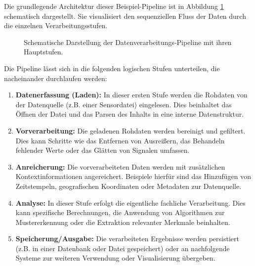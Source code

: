 \documentclass[11pt, a4paper]{article}
\begin{document}
Die grundlegende Architektur dieser Beispiel-Pipeline ist in Abbildung \ref{fig:architektur} schematisch dargestellt. Sie visualisiert den sequenziellen Fluss der Daten durch die einzelnen Verarbeitungsstufen.

\begin{figure}[htbp] %
    \centering %
    \caption{Schematische Darstellung der Datenverarbeitungs-Pipeline mit ihren Hauptstufen.} %
    \label{fig:architektur} %
\end{figure}

Die Pipeline lässt sich in die folgenden logischen Stufen unterteilen, die nacheinander durchlaufen werden:

\begin{enumerate}
    \item \textbf{Datenerfassung (Laden):} In dieser ersten Stufe werden die Rohdaten von der Datenquelle (z.B. einer Sensordatei) eingelesen. Dies beinhaltet das Öffnen der Datei und das Parsen des Inhalts in eine interne Datenstruktur.
    \item \textbf{Vorverarbeitung:} Die geladenen Rohdaten werden bereinigt und gefiltert. Dies kann Schritte wie das Entfernen von Ausreißern, das Behandeln fehlender Werte oder das Glätten von Signalen umfassen.
    \item \textbf{Anreicherung:} Die vorverarbeiteten Daten werden mit zusätzlichen Kontextinformationen angereichert. Beispiele hierfür sind das Hinzufügen von Zeitstempeln, geografischen Koordinaten oder Metadaten zur Datenquelle.
    \item \textbf{Analyse:} In dieser Stufe erfolgt die eigentliche fachliche Verarbeitung. Dies kann spezifische Berechnungen, die Anwendung von Algorithmen zur Mustererkennung oder die Extraktion relevanter Merkmale beinhalten.
    \item \textbf{Speicherung/Ausgabe:} Die verarbeiteten Ergebnisse werden persistiert (z.B. in einer Datenbank oder Datei gespeichert) oder an nachfolgende Systeme zur weiteren Verwendung oder Visualisierung übergeben.
\end{enumerate}
\end{document}
